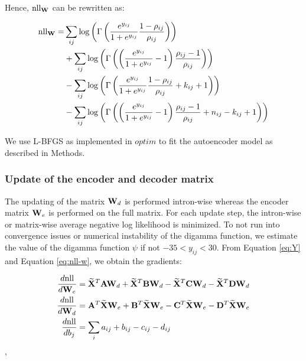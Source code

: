 Hence,  $\text{nll}_{\mathbf{W}}$ can be rewritten as:

\begin{align*}
\text{nll}_{\mathbf{W}} =& \sum_{ij}\log\left(\Gamma\left(\frac{ e^{y_{ij}} }{ 1+e^{y_{ij}} }\frac{ 1-\rho_{ij} }{ \rho_{ij} }\right) \right) \\
&+ \sum_{ij}\log\left(\Gamma\left( \left (\frac{ e^{y_{ij}} }{ 1+e^{y_{ij}} } - 1 \right) \frac{ \rho_{ij} - 1 }{ \rho_{ij} }\right) \right) \\
&- \sum_{ij}\log\left(\Gamma\left(\frac{ e^{y_{ij}} }{ 1+e^{y_{ij}} }\frac{ 1-\rho_{ij} }{ \rho_{ij} } + k_{ij} + 1 \right) \right) \\ 
&- \sum_{ij}\log\left(\Gamma\left( \left (\frac{ e^{y_{ij}} }{ 1+e^{y_{ij}} } - 1 \right) \frac{ \rho_{ij} - 1 }{ \rho_{ij} } + n_{ij} - k_{ij} + 1\right) \right) 
\end{align*}


We use L-BFGS\cite{byrd1995} as implemented in $optim$  to fit the autoencoder
model as described in Methods.


\subsubsection*{Update of the encoder and decoder matrix}

The updating of the matrix $\mathbf{W}_d$ is performed intron-wise whereas the 
encoder matrix $\mathbf{W}_e$ is performed on the full matrix. For each update step,
the intron-wise or matrix-wise average negative log likelihood is minimized. 
To not run into convergence issues or numerical instability of the digamma function, 
we estimate the value of the digamma function $\psi$ if not $-35 < y_{ij} < 30$.
From Equation  \ref{eq:Y} and Equation \ref{eq:nll-w}, we obtain the gradients:

\begin{align*}
    \frac{d\text{nll}}{d\mathbf{W}_e} &= \mathbf{\widetilde{X}}^T \mathbf{A} \mathbf{W}_d + \mathbf{\widetilde{X}}^T \mathbf{B} \mathbf{W}_d - \mathbf{\widetilde{X}}^T \mathbf{C} \mathbf{W}_d - \mathbf{\widetilde{X}}^T \mathbf{D} \mathbf{W}_d  \\  
    \frac{d\text{nll}}{d\mathbf{W}_d} &= \mathbf{A}^T \mathbf{\widetilde{X}} \mathbf{W}_e + \mathbf{B}^T \mathbf{\widetilde{X}}\mathbf{W}_e - \mathbf{C}^T \mathbf{\widetilde{X}}\mathbf{W}_e - \mathbf{D}^T \mathbf{\widetilde{X}} \mathbf{W}_e \\
    \frac{d\text{nll}}{db_j} &= \sum_{i} a_{ij} + b_{ij} - c_{ij} - d_{ij}
    \end{align*},

